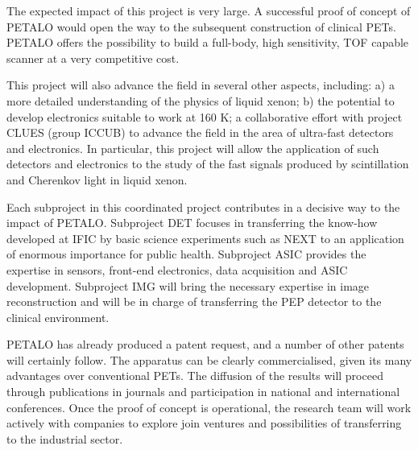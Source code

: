 
The expected impact of this project is very large. A successful proof of concept of PETALO would open the way to the subsequent construction of clinical PETs. PETALO offers the possibility to build a full-body, high sensitivity, TOF capable scanner at a very competitive cost. 

This project will also advance the field in several other aspects, including: a) a more detailed understanding of the physics of liquid xenon; b) the potential to develop electronics suitable to work at 160 K; a collaborative effort with project CLUES (group ICCUB) to advance the field in the area of ultra-fast detectors and electronics. In particular, this project will allow the application of such detectors and electronics to the study of the fast signals produced by scintillation and Cherenkov light in liquid xenon. 

Each subproject in this coordinated project contributes in a decisive way to the impact of PETALO. Subproject DET focuses in transferring the know-how developed at IFIC by basic science experiments such as NEXT to an application of enormous importance for public health. Subproject ASIC provides the expertise in sensors, front-end electronics, data acquisition and ASIC development. Subproject IMG will bring the necessary expertise in image reconstruction and will be in charge of transferring the PEP detector to the clinical environment. 

PETALO has already produced a patent request, and a number of other patents will certainly follow. The apparatus can be clearly commercialised, given its many advantages over conventional PETs. The diffusion of the results will proceed through publications in journals and participation in national and international conferences. Once the proof of concept is operational, the research team will work actively with companies to explore join ventures and possibilities of transferring to the industrial sector. 

